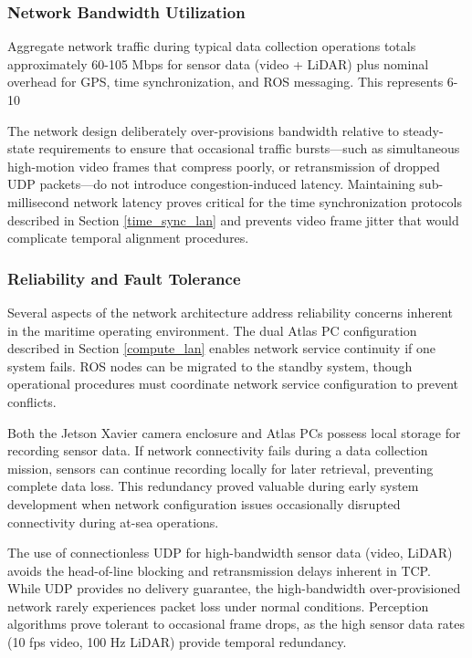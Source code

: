 \documentclass{erauthesis}
\begin{document}
\subsubsection{Network Bandwidth Utilization}

Aggregate network traffic during typical data collection operations totals approximately 60-105 Mbps for sensor data (video + LiDAR) plus nominal overhead for GPS, time synchronization, and ROS messaging. This represents 6-10%

The network design deliberately over-provisions bandwidth relative to steady-state requirements to ensure that occasional traffic bursts—such as simultaneous high-motion video frames that compress poorly, or retransmission of dropped UDP packets—do not introduce congestion-induced latency. Maintaining sub-millisecond network latency proves critical for the time synchronization protocols described in Section \ref{time_sync_lan} and prevents video frame jitter that would complicate temporal alignment procedures.

\subsubsection{Reliability and Fault Tolerance}

Several aspects of the network architecture address reliability concerns inherent in the maritime operating environment. The dual Atlas PC configuration described in Section \ref{compute_lan} enables network service continuity if one system fails. ROS nodes can be migrated to the standby system, though operational procedures must coordinate network service configuration to prevent conflicts.

Both the Jetson Xavier camera enclosure and Atlas PCs possess local storage for recording sensor data. If network connectivity fails during a data collection mission, sensors can continue recording locally for later retrieval, preventing complete data loss. This redundancy proved valuable during early system development when network configuration issues occasionally disrupted connectivity during at-sea operations.

The use of connectionless UDP for high-bandwidth sensor data (video, LiDAR) avoids the head-of-line blocking and retransmission delays inherent in TCP. While UDP provides no delivery guarantee, the high-bandwidth over-provisioned network rarely experiences packet loss under normal conditions. Perception algorithms prove tolerant to occasional frame drops, as the high sensor data rates (10 fps video, 100 Hz LiDAR) provide temporal redundancy.
\end{document}
